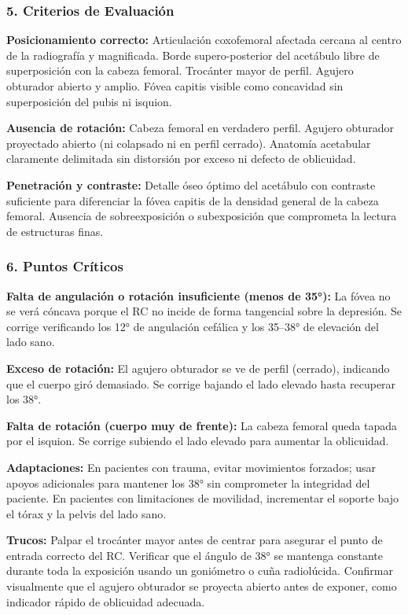 	\subsubsection*{5. Criterios de Evaluación}
	
	\textbf{Posicionamiento correcto:} Articulación coxofemoral afectada cercana al centro de la radiografía y magnificada. Borde supero-posterior del acetábulo libre de superposición con la cabeza femoral. Trocánter mayor de perfil. Agujero obturador abierto y amplio. Fóvea capitis visible como concavidad sin superposición del pubis ni isquion.
	
	\textbf{Ausencia de rotación:} Cabeza femoral en verdadero perfil. Agujero obturador proyectado abierto (ni colapsado ni en perfil cerrado). Anatomía acetabular claramente delimitada sin distorsión por exceso ni defecto de oblicuidad.
	
	\textbf{Penetración y contraste:} Detalle óseo óptimo del acetábulo con contraste suficiente para diferenciar la fóvea capitis de la densidad general de la cabeza femoral. Ausencia de sobreexposición o subexposición que comprometa la lectura de estructuras finas.
	
	\subsubsection*{6. Puntos Críticos}
	
	\textbf{Falta de angulación o rotación insuficiente (menos de 35°):} La fóvea no se verá cóncava porque el RC no incide de forma tangencial sobre la depresión. Se corrige verificando los 12° de angulación cefálica y los 35--38° de elevación del lado sano.
	
	\textbf{Exceso de rotación:} El agujero obturador se ve de perfil (cerrado), indicando que el cuerpo giró demasiado. Se corrige bajando el lado elevado hasta recuperar los 38°.
	
	\textbf{Falta de rotación (cuerpo muy de frente):} La cabeza femoral queda tapada por el isquion. Se corrige subiendo el lado elevado para aumentar la oblicuidad.
	
	\textbf{Adaptaciones:} En pacientes con trauma, evitar movimientos forzados; usar apoyos adicionales para mantener los 38° sin comprometer la integridad del paciente. En pacientes con limitaciones de movilidad, incrementar el soporte bajo el tórax y la pelvis del lado sano.
	
	\textbf{Trucos:} Palpar el trocánter mayor antes de centrar para asegurar el punto de entrada correcto del RC. Verificar que el ángulo de 38° se mantenga constante durante toda la exposición usando un goniómetro o cuña radiolúcida. Confirmar visualmente que el agujero obturador se proyecta abierto antes de exponer, como indicador rápido de oblicuidad adecuada.
	
